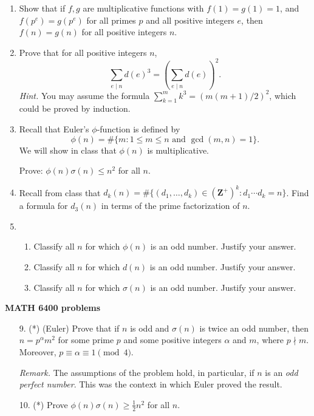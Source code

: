 \documentclass[12pt]{article}
\def\Z{\mathbf{Z}}
\begin{document}
\begin{enumerate}
\item Show that if $f, g$ are multiplicative functions with $f(1)=g(1)=1$, and $f(p^e) = g(p^e)$ for all primes $p$ and all positive integers $e$, then $f(n)=g(n)$ for all positive integers $n$.

\item Prove that for all positive integers $n$,
\[ \sum_{e \mid n} d(e)^3 = \left(\sum_{e \mid n}d(e)\right)^2.\]
{\scriptsize \emph{Hint.} You may assume the formula $\sum_{k=1}^{m} k^3 = (m(m+1)/2)^2$, which could be proved by induction.}

\item Recall that Euler's $\phi$-function is defined by $$\phi(n) = \#\{m: 1 \le m\le n\text{ and } \gcd(m,n)=1\}.$$
We will show in class that $\phi(n)$ is multiplicative.

Prove: $\phi(n) \sigma(n) \le n^2$ for all $n$.

\item Recall from class that $d_k(n) = \#\{(d_1,\dots,d_k) \in (\Z^{+})^k: d_1\cdots d_k = n\}$. Find a formula for $d_3(n)$ in terms of the prime factorization of $n$.

\item \begin{enumerate}
\item Classify all $n$ for which $\phi(n)$ is an odd number. Justify your answer.
\item Classify all $n$ for which $d(n)$ is an odd number. Justify your answer.
    \item Classify all $n$ for which $\sigma(n)$ is an odd number. Justify your answer.
\end{enumerate}

\end{enumerate}

\vskip 10pt \noindent\textbf{MATH 6400 problems}

\begin{enumerate}
\item[9.] (*) (Euler) Prove that if $n$ is odd and $\sigma(n)$ is twice an odd number, then $n = p^\alpha m^2$ for some prime $p$ and some positive integers $\alpha$ and $m$, where $p\nmid m$. Moreover, $p \equiv \alpha \equiv 1\pmod{4}$.

{\scriptsize \emph{Remark.} The assumptions of the problem hold, in particular, if $n$ is an \emph{odd perfect number}. This was the context in which Euler proved the result.} 


\item[10.] (*) Prove $\phi(n) \sigma(n) \ge \frac{1}{2}n^2$ for all $n$.
\end{enumerate}
\end{document}
